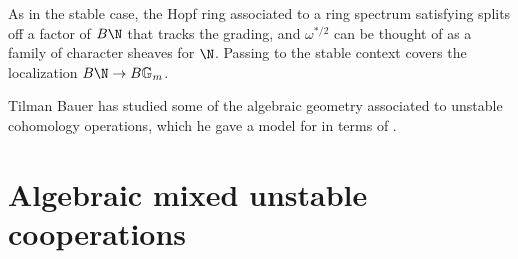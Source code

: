 
\begin{remark}
As in the stable case, the Hopf ring associated to a ring spectrum satisfying {\UFH} splits off a factor of \(B\N\) that tracks the grading, and \(\omega^{*/2}\) can be thought of as a family of character sheaves for \(\N\).  Passing to the stable context covers the localization \(B\N \to B\Gm\).
\end{remark}

\begin{remark}
Tilman Bauer has studied some of the algebraic geometry associated to unstable cohomology operations, which he gave a model for in terms of .
\end{remark}










\section{Algebraic mixed unstable cooperations}\label{UnstableAlgebraicModelSection}

